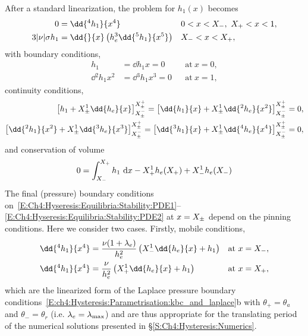 After a standard linearization, the problem for $h_1(x)$ becomes
\begin{align}
0 &= \dd{^4 h_1}{x^4} & & 0 < x < \xlefteq,~\xrighteq < x < 1,\label{E:Ch4:Hyseresis:Equilibria:Stability:PDE1}\\
3|\nu|\sigma h_1 &=\dd{}{x} \left(h_e^3 \dd{^5 h_1}{x^5}\right) & &\xlefteq < x < \xrighteq,\label{E:Ch4:Hyseresis:Equilibria:Stability:PDE2}
\end{align}
with boundary conditions,
\begin{align}
h_1 & = \dd{h_1}{x} = 0 & &\text{at}~x = 0,\\
\dd{^2 h_1}{x^2} &=\dd{^3 h_1}{x^3} = 0 & &\text{at}~x = 1,
\end{align}
continuity conditions,
\begin{align}
\left[h_1 + \xpmeq^1\dd{h_e}{x}\right]_{\xpmeq^-}^{\xpmeq^+} = \left[\dd{h_1}{x} + \xpmeq^1\dd{^2 h_e}{x^2}\right]_{\xpmeq^-}^{\xpmeq^+} &=0, \\ \left[\dd{^2 h_1}{x^2 } +\xpmeq^1 \dd{^3 h_e}{x^3}\right]_{\xpmeq^-}^{\xpmeq^+} = \left[\dd{^3 h_1}{x} +\xpmeq^1 \dd{^4 h_e}{x^4}\right]_{\xpmeq^-}^{\xpmeq^+}  &= 0,
\end{align}
and conservation of volume
\begin{equation}\label{E:Ch4:Hyseresis:Equilibria:Stability:kinematic}
0 = \int_{X_{-}}^{X_{+}}h_1 ~\mathrm{d}x - X_{+}^1 h_e(X_{+}) + X_{-}^1 h_e(X_{-})
\end{equation}
The final (pressure) boundary conditions on~\eqref{E:Ch4:Hyseresis:Equilibria:Stability:PDE1}--\eqref{E:Ch4:Hyseresis:Equilibria:Stability:PDE2} at $x = X_{\pm}$ depend on the pinning conditions. Here we consider two cases. Firstly, mobile conditions,
\begin{align}
\dd{^4h_1}{x^4} &= \frac{\nu(1+ \hyspare)}{h_e^2} \left(\xlefteq^1\dd{h_e}{x} + h_1\right) & &\text{at}~x = \xlefteq,\label{E:Ch4:Hyseresis:Equilibria:Stability:translatingbc1}\\
\dd{^4 h_1}{x^4} &= \frac{\nu}{h_e^2} \left( \xrighteq^1\dd{h_e}{x} + h_1\right)& &\text{at}~x = \xrighteq,\label{E:Ch4:Hyseresis:Equilibria:Stability:translatingbc2}
\end{align}
which are the linearized form of the Laplace pressure boundary conditions~\eqref{E:ch4:Hysteresis:Parametrisation:kbc_and_laplace}b with $\theta_+ = \theta_a$ and $\theta_- = \theta_r$ (i.e. $\lambda_e = \lambda_{\text{max}}$) and are thus appropriate for the translating period of the numerical solutions presented in \S\ref{S:Ch4:Hysteresis:Numerics}.

